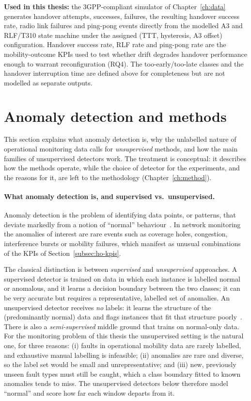 \textbf{Used in this thesis:} the 3GPP-compliant simulator of
Chapter~\ref{ch:data} generates handover attempts, successes, failures, the
resulting handover success rate, radio link failures and ping-pong events
directly from the modelled A3 and RLF/T310 state machine under the assigned
(TTT, hysteresis, A3 offset) configuration. Handover success rate, RLF rate and
ping-pong rate are the mobility-outcome KPIs used to test whether drift degrades
handover performance enough to warrant reconfiguration (RQ4). The
too-early/too-late classes and the handover interruption time are defined above
for completeness but are not modelled as separate outputs.

\section{Anomaly detection and methods}
\label{sec:anomaly-background}

This section explains what anomaly detection is, why the unlabelled nature of
operational monitoring data calls for \emph{unsupervised} methods, and how the
main families of unsupervised detectors work. The treatment is conceptual: it
describes how the methods operate, while the choice of detector for the
experiments, and the reasons for it, are left to the methodology
(Chapter~\ref{ch:method}).

\paragraph{What anomaly detection is, and supervised vs.\ unsupervised.}
Anomaly detection is the problem of identifying data points, or patterns, that
deviate markedly from a notion of ``normal'' behaviour~\cite{chandola2009anomaly}.
In network monitoring the anomalies of interest are rare events such as coverage
holes, congestion, interference bursts or mobility failures, which manifest as
unusual combinations of the KPIs of Section~\ref{subsec:ho-kpis}.

The classical distinction is between \emph{supervised} and \emph{unsupervised}
approaches. A supervised detector is trained on data in which each instance is
labelled normal or anomalous, and it learns a decision boundary between the two
classes; it can be very accurate but requires a representative, labelled set of
anomalies. An unsupervised detector receives \emph{no} labels: it learns the
structure of the (predominantly normal) data and flags instances that fit that
structure poorly~\cite{chandola2009anomaly}. There is also a
\emph{semi-supervised} middle ground that trains on normal-only data. For the
monitoring problem of this thesis the unsupervised setting is the natural one,
for three reasons: (i) faults in operational mobility data are rarely labelled,
and exhaustive manual labelling is infeasible; (ii) anomalies are rare and
diverse, so the label set would be small and unrepresentative; and (iii) new,
previously unseen fault types must still be caught, which a class boundary
fitted to known anomalies tends to miss. The unsupervised detectors below
therefore model ``normal'' and score how far each window departs from it.

